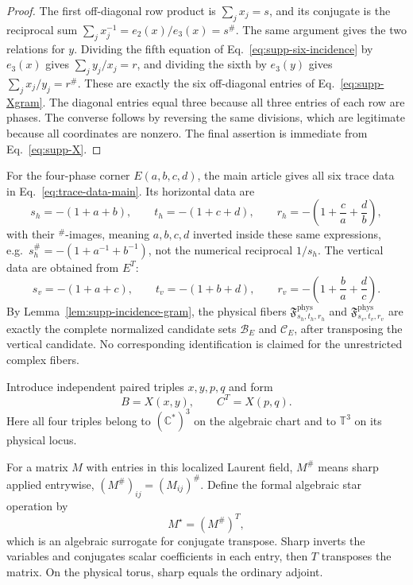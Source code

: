 \documentclass[aps,prx,reprint,nofootinbib,twoside,superscriptaddress,longbibliography,floatfix]{revtex4-2}
\theoremstyle{definition}
\newcommand{\T}{\mathbb T}
\newcommand{\C}{\mathbb C}
\begin{document}
\begin{proof}
The first off-diagonal row product is $\sum_jx_j=s$, and its conjugate is the reciprocal sum $\sum_jx_j^{-1}=e_2(x)/e_3(x)=s^\#$.  The same argument gives the two relations for $y$.  Dividing the fifth equation of Eq.~\eqref{eq:supp-six-incidence} by $e_3(x)$ gives $\sum_jy_j/x_j=r$, and dividing the sixth by $e_3(y)$ gives $\sum_jx_j/y_j=r^\#$. These are exactly the six off-diagonal entries of Eq.~\eqref{eq:supp-Xgram}. The diagonal entries equal three because all three entries of each row are phases.  The converse follows by reversing the same divisions, which are legitimate because all coordinates are nonzero.  The final assertion is immediate from Eq.~\eqref{eq:supp-X}.
\end{proof}


For the four-phase corner $E(a,b,c,d)$, the main article gives all six trace data in Eq.~\eqref{eq:trace-data-main}.  Its horizontal data are
\begin{equation}
s_h=-(1+a+b),\qquad t_h=-(1+c+d),\qquad
r_h=-\left(1+\frac ca+\frac db\right),
\label{eq:supp-horizontal-data}
\end{equation}
with their $^{\#}$-images, meaning $a,b,c,d$ inverted inside these same expressions, e.g.\ $s_h^\#=-(1+a^{-1}+b^{-1})$, not the numerical reciprocal $1/s_h$.  The vertical data are obtained from $E^T$:
\begin{equation}
s_v=-(1+a+c),\qquad t_v=-(1+b+d),\qquad
r_v=-\left(1+\frac ba+\frac dc\right).
\label{eq:supp-vertical-data}
\end{equation}
By Lemma~\ref{lem:supp-incidence-gram}, the physical fibers $\mathfrak F^{\mathrm{phys}}_{s_h,t_h,r_h}$ and $\mathfrak F^{\mathrm{phys}}_{s_v,t_v,r_v}$ are exactly the complete normalized candidate sets $\mathcal B_E$ and $\mathcal C_E$, after transposing the vertical candidate.  No corresponding identification is claimed for the unrestricted complex fibers.

Introduce independent paired triples $x,y,p,q$ and form
\begin{equation}
B=X(x,y),\qquad C^T=X(p,q).
\label{eq:supp-BC}
\end{equation}
Here all four triples belong to $(\C^*)^3$ on the algebraic chart and to $\T^3$ on its physical locus.

For a matrix $M$ with entries in this localized Laurent field, $M^\#$ means sharp applied entrywise, $(M^\#)_{ij}=(M_{ij})^\#$. Define the formal algebraic star operation by
\begin{equation}
M^\star=(M^\#)^T,
\label{eq:supp-formal-star}
\end{equation}
which is an algebraic surrogate for conjugate transpose. Sharp inverts the variables and conjugates scalar coefficients in each entry, then $T$ transposes the matrix. On the physical torus, sharp equals the ordinary adjoint.
\end{document}
